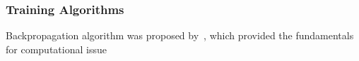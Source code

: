 \subsubsection{Training Algorithms}
Backpropagation algorithm was proposed by~\citet{werbos1975beyond}, which provided the fundamentals for computational issue